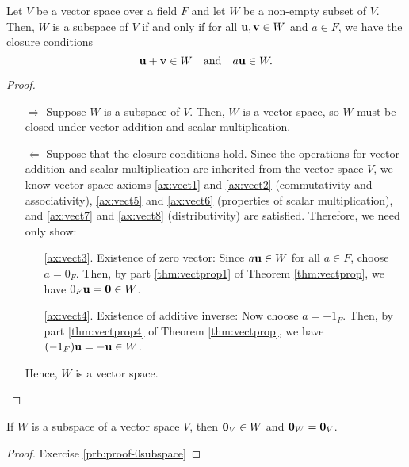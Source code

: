 \begin{theorem}\label{thm:subspacetest}
Let $ V $ be a vector space over a field $ F $ and let $ W $ be a non-empty subset of $ V $. Then, $ W $ is a subspace of $ V $ if and only if for all $ \mathbf{u},\mathbf{v}\in W $ and $ a\in F $, we have the closure conditions
\begin{equation*}
    \mathbf{u}+\mathbf{v}\in W \quad\text{and}\quad a\mathbf{u}\in W.
\end{equation*}
\end{theorem}
\begin{proof}~
\begin{enumerate}
    \item[$ \Rightarrow $] Suppose $ W $ is a subspace of $ V $. Then, $ W $ is a vector space, so $ W $ must be closed under vector addition and scalar multiplication.
    
    \item[$ \Leftarrow $] Suppose that the closure conditions hold. Since the operations for vector addition and scalar multiplication are inherited from the vector space $ V $, we know vector space axioms \ref{ax:vect1} and \ref{ax:vect2} (commutativity and associativity), \ref{ax:vect5} and \ref{ax:vect6} (properties of scalar multiplication), and \ref{ax:vect7} and \ref{ax:vect8} (distributivity) are satisfied. Therefore, we need only show:
    \begin{enumerate}
        \item[\ref{ax:vect3}.] Existence of zero vector: Since $ a\mathbf{u}\in W $ for all $ a\in F $, choose $ a=0_F $. Then, by part \ref{thm:vectprop1} of Theorem \ref{thm:vectprop}, we have $ 0_F\mathbf{u}=\mathbf{0}\in W $.
        
        \item[\ref{ax:vect4}.] Existence of additive inverse: Now choose $ a=-1_F $. Then, by part \ref{thm:vectprop4} of Theorem \ref{thm:vectprop}, we have $ (-1_F)\mathbf{u}=-\mathbf{u}\in W $.
    \end{enumerate}
    Hence, $ W $ is a vector space.\qedhere
\end{enumerate}
\end{proof}

\begin{lemma}\label{lem:0subspace}
If $ W $ is a subspace of a vector space $ V $, then $ \mathbf{0}_V\in W $ and $ \mathbf{0}_W=\mathbf{0}_V $.
\end{lemma}
\begin{proof}
Exercise \ref{prb:proof-0subspace}\noqed
\end{proof}


